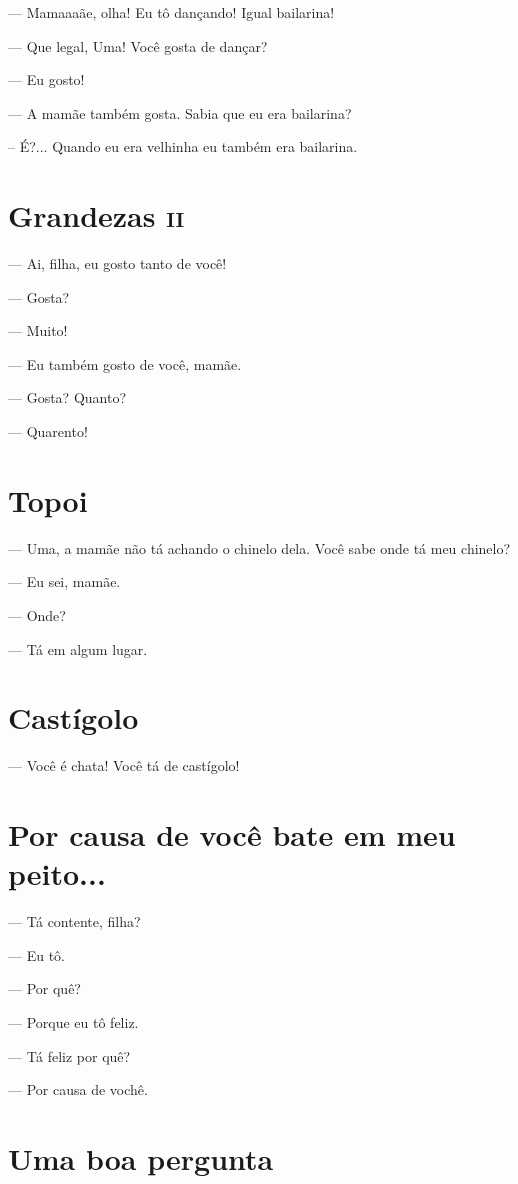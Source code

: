 {— Mamaaaãe, olha! Eu tô dançando! Igual bailarina!

— Que legal, Uma! Você gosta de dançar?

— Eu gosto!

— A mamãe também gosta. Sabia que eu era bailarina?

-- É?... Quando eu era velhinha eu também era bailarina.

\chapter{Grandezas \textsc{ii}}

— Ai, filha, eu gosto tanto de você!

— Gosta?

— Muito!

— Eu também gosto de você, mamãe.

— Gosta? Quanto?

— Quarento!

\chapter{Topoi}

— Uma, a mamãe não tá achando o chinelo dela. Você sabe onde tá meu
chinelo?

— Eu sei, mamãe.

— Onde?

— Tá em algum lugar.

\chapter{Castígolo}

— Você é chata! Você tá de castígolo!

\chapter{Por causa de você bate em meu peito...}

— Tá contente, filha?

— Eu tô.

— Por quê?

— Porque eu tô feliz.

— Tá feliz por quê?

— Por causa de vochê.

\chapter{Uma boa pergunta}

}
